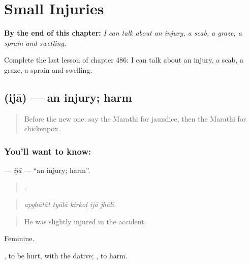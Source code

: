 
\chapter{Small Injuries}
\label{ch:mr-small-injuries}

\begin{chapteropening}
\textbf{By the end of this chapter:} \emph{I can talk about an injury, a scab, a graze, a sprain and swelling.}

Complete the last lesson of chapter 486: I can talk about an injury, a scab, a graze, a sprain and swelling.
\end{chapteropening}

\section[\texorpdfstring{\mr{इजा} (ijā)}{इजा (ijā)}]{ (ijā) — an injury; harm}

\label{lesson:MR-C486-ija}



\begin{quote}
Before the new one: say the Marathi for jaundice, then the Marathi for chickenpox.
\end{quote}

\subsection*{You'll want to know: }
\textbf{} — \emph{ijā} — \textquotedblleft{}an injury; harm\textquotedblright{}.

\begin{quote}
    .
\end{quote}

\begin{quote}
\emph{apghātāt tyālā kirkoḷ ijā jhālī.}
\end{quote}

\begin{quote}
He was slightly injured in the accident.
\end{quote}

Feminine.

 , to be hurt, with the dative;  , to harm.

